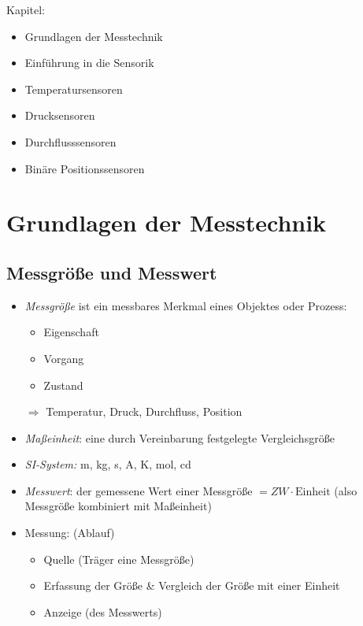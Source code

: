 \documentclass{scrreprt}
\renewcommand{\imptnt}[1]{#1}
\begin{document}
Kapitel:
\begin{itemize}
\item Grundlagen der Messtechnik
\item Einführung in die Sensorik
\item Temperatursensoren
\item Drucksensoren
\item Durchflusssensoren
\item Binäre Positionssensoren
\end{itemize}

\chapter{Grundlagen der Messtechnik}

\section{Messgröße und Messwert}

\begin{itemize}
\item \imptnt{\emph{Messgröße}} ist ein messbares \imptnt{Merkmal} eines Objektes oder Prozess:
\begin{itemize}
\item Eigenschaft 
\item Vorgang
\item Zustand
\end{itemize}
$\Rightarrow$ Temperatur, Druck, Durchfluss, Position
\item \imptnt{\emph{Maßeinheit}}: eine durch Vereinbarung festgelegte \imptnt{Vergleichsgröße}
\item \emph{SI-System:} m, kg, s, A, K, mol, cd
\item \imptnt{\emph{Messwert}}: der gemessene Wert einer Messgröße 
$=ZW \cdot \mathrm{Einheit}$ 
(also Messgröße kombiniert mit Maßeinheit)
\item Messung: (Ablauf)
\begin{itemize}
\item Quelle (Träger eine Messgröße)
\item Erfassung der Größe \& Vergleich der Größe mit einer Einheit
\item Anzeige (des Messwerts)
\end{itemize}
\end{itemize}
\end{document}

